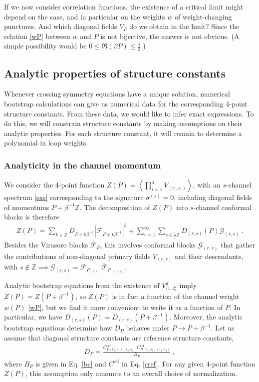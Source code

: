 \documentclass[12pt, a4paper]{article}
\theoremstyle{break}
\begin{document}
If we now consider correlation functions, the existence of a critical limit might depend on the case, and in particular on the weights $w$ of weight-changing punctures. And which diagonal fields $V_P$ do we obtain in the limit? Since the relation \eqref{wP} between $w$ and $P$ is not bijective, the answer is not obvious. (A simple possibility would be $0\leq \Re(\beta P)\leq \frac12$.) 


\subsection{Analytic properties of structure constants}

Whenever crossing symmetry equations have a unique solution, numerical bootstrap calculations can give us numerical data for the corresponding 4-point structure constants. From these data, we would like to infer exact expressions. To do this, we will constrain structure constants by making assumptions on their analytic properties. 
For each structure constant, it will remain to determine a polynomial in loop weights.

\subsubsection{Analyticity in the channel momentum}

We consider the 4-point function $Z(P)=\left<\prod_{i=1}^4 V_{(r_i,s_i)}\right>$, with an $s$-channel spectrum 
\eqref{sxs} corresponding to the signature $\sigma^{(s)}=0$, including 
diagonal fields of momentums $P+\beta^{-1}\mathbb{Z}$. The decomposition of $Z(P)$ into $s$-channel conformal blocks is therefore
\begin{align}
 Z(P) = \sum_{k\in\mathbb{Z}} D_{P+k\beta^{-1}} \left|\mathcal{F}_{P+k\beta^{-1}}\right|^2 +\sum_{r=1}^\infty \sum_{s\in\frac{1}{r}\mathbb{Z}} D_{(r,s)}(P) \mathcal{G}_{(r,s)}\ .
\end{align}
Besides the Virasoro blocks $\mathcal{F}_P$, this involves conformal blocks $\mathcal{G}_{(r,s)}$ that gather the contributions of non-diagonal primary fields $V_{(r,s)}$ and their descendants, with $s\notin\mathbb{Z}\implies \mathcal{G}_{(r,s)} = \mathcal{F}_{P_{(r,s)}}\bar{\mathcal{F}}_{P_{(r,-s)}}$. 

Analytic bootstrap equations from the existence of $V^d_{\langle 1,2\rangle}$ imply $Z(P)=Z(P+\beta^{-1})$, so $Z(P)$ is in fact a function of the channel weight $w(P)$ \eqref{wP}, but we find it more convenient to write it as a function of $P$. In particular, we have $D_{(r,s)}(P)=D_{(r,s)}(P+\beta^{-1})$. Moreover, the analytic bootstrap equations 
determine how $D_P$ behaves under $P\to P+\beta^{-1}$. Let us assume that diagonal structure constants are reference structure constants,
\begin{align}
 D_P = \frac{C^\text{ref}_{P(r_1,s_1)(r_2,s_2)}C^\text{ref}_{P(r_3,s_3)(r_4,s_4)}}{B_P}\ ,
\end{align}
where $B_P$ is given in Eq. \eqref{bc} and $C^\text{ref}$ in Eq. \eqref{cref}. For any given 4-point function $Z(P)$, this assumption only amounts to an overall choice of normalization. 
\end{document}
